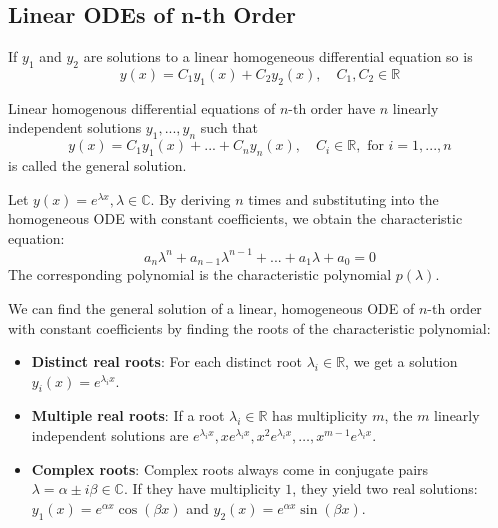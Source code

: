 \subsection{Linear ODEs of n-th Order}

\begin{theorem}
    If $y_1$ and $y_2$ are solutions to a linear homogeneous differential equation so is
    $$y(x) = C_1 y_1(x) + C_2 y_2(x), \quad C_1, C_2 \in \mathbb{R}$$
\end{theorem}

\begin{theorem}
    Linear homogenous differential equations of $n$-th order have $n$ linearly independent solutions $y_1, ..., y_n$ such that
    $$y(x) = C_1 y_1(x) + ... + C_n y_n(x), \quad C_i \in \mathbb{R}, \text{ for } i = 1, ..., n$$
    is called the general solution.
\end{theorem}

\begin{lemma}
    Let $y(x) = e^{\lambda x}, \lambda \in \mathbb{C}$. By deriving $n$ times and substituting into the homogeneous ODE with constant coefficients, we obtain the characteristic equation:
    $$a_n \lambda^n + a_{n-1} \lambda^{n-1} + ... + a_1 \lambda + a_0 = 0$$
    The corresponding polynomial is the characteristic polynomial $p(\lambda)$.
\end{lemma}

\begin{theorem}
    We can find the general solution of a linear, homogeneous ODE of $n$-th order with constant coefficients by finding the roots of the characteristic polynomial:
    \begin{itemize}
        \item \textbf{Distinct real roots}: For each distinct root $\lambda_i \in \mathbb{R}$, we get a solution $y_i(x) = e^{\lambda_i x}$.
        \item \textbf{Multiple real roots}: If a root $\lambda_i \in \mathbb{R}$ has multiplicity $m$, the $m$ linearly independent solutions are $e^{\lambda_i x}, x e^{\lambda_i x}, x^2 e^{\lambda_i x}, \dots, x^{m-1} e^{\lambda_i x}$.
        \item \textbf{Complex roots}: Complex roots always come in conjugate pairs $\lambda = \alpha \pm i \beta \in \mathbb{C}$. If they have multiplicity $1$, they yield two real solutions: $y_1(x) = e^{\alpha x} \cos(\beta x)$ and $y_2(x) = e^{\alpha x} \sin(\beta x)$.
    \end{itemize}
\end{theorem}

